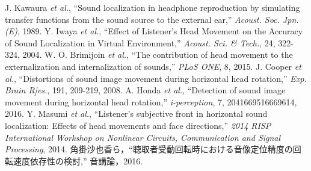 \documentclass[12pt,a4j]{jsarticle}
\renewcommand{\ }{\hspace{1zw}}
\begin{document}
\begin{thebibliography}{1}
     J. Kawaura {\it et al.}, ``Sound localization in headphone reproduction by simulating transfer functions from the sound source to the external ear,'' {\it Acoust. Soc. Jpn.(E)}, 1989.
     Y. Iwaya {\it et al.}, ``Effect of Listener's Head Movement on the Accuracy of Sound Localization in Virtual Environment,'' {\it Acoust. Sci. \& Tech.}, 24, 322-324, 2004.
     W. O. Brimijoin {\it et al.}, ``The contribution of head movement to the externalization and internalization of sounds,'' {\it PLoS ONE}, 8, 2015.
     J. Cooper {\it et al.}, ``Distortions of sound image movement during horizontal head rotation,'' {\it Exp. Brain R]es.}, 191, 209-219, 2008.
     A. Honda {\it et al.}, ``Detection of sound image movement during horizontal head rotation,'' {\it i-perception}, 7, 2041669516669614, 2016.
     Y. Masumi {\it et al.}, ``Listener's subjective front in horizontal sound localization: Effects of head movements and face directions,'' {\it 2014 RISP International Workshop on Nonlinear Circuits, Communication and Signal Processing}, 2014.
     角掛沙也香ら，``聴取者受動回転時における音像定位精度の回転速度依存性の検討,'' 音講論，2016.
\end{thebibliography}
\end{document}
